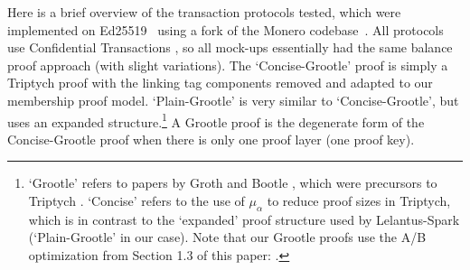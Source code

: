 Here is a brief overview of the transaction protocols tested, which were implemented on Ed25519~\cite{Bernstein2012-high-speed-high-security-ed25519} using a fork of the Monero codebase~\cite{seraphis-perf-branch}. All protocols use Confidential Transactions \cite{maxwell-ct-2}, so all mock-ups essentially had the same balance proof approach (with slight variations). The `Concise-Grootle' proof is simply a Triptych \cite{triptych-preprint} proof with the linking tag components removed and adapted to our membership proof model. `Plain-Grootle' is very similar to `Concise-Grootle', but uses an expanded structure.\footnote{`Grootle' refers to papers by Groth \cite{groth-one-out-of-many} and Bootle \cite{bootle-one-of-many}, which were precursors to Triptych \cite{triptych-preprint}. `Concise' refers to the use of $\mu_{\alpha}$ to reduce proof sizes in Triptych, which is in contrast to the `expanded' proof structure used by Lelantus-Spark \cite{lelantus-spark} (`Plain-Grootle' in our case). Note that our Grootle proofs use the A/B optimization from Section 1.3 of this paper: \cite{matrict}.} A Grootle proof is the degenerate form of the Concise-Grootle proof when there is only one proof layer (one proof key).

